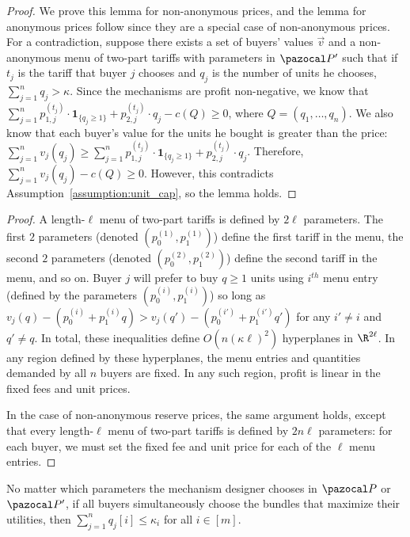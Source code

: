 \begin{proof}
We prove this lemma for non-anonymous prices, and the lemma for anonymous prices follow since they are a special case of non-anonymous prices. For a contradiction, suppose there exists a set of buyers' values $\vec{v}$ and a non-anonymous menu of two-part tariffs with parameters in $\pspace'$ such that if $t_j$ is the tariff that buyer $j$ chooses and $q_j$ is the number of units he chooses, $\sum_{j = 1}^n q_j > \kappa$. Since the mechanisms are profit non-negative, we know that $\sum_{j = 1}^n p_{1,j}^{(t_j)} \cdot \textbf{1}_{\{q_j \geq 1\}} + p_{2,j}^{(t_j)} \cdot q_j - c\left(Q\right) \geq 0$, where $Q = (q_1, \dots, q_n)$. We also know that each buyer's value for the units he bought is greater than the price: $\sum_{j = 1}^n v_j(q_j) \geq \sum_{j = 1}^n p_{1,j}^{(t_j)} \cdot \textbf{1}_{\{q_j \geq 1\}} + p_{2,j}^{(t_j)} \cdot q_j$. Therefore, $\sum_{j = 1}^n v_j(q_j) - c(Q) \geq 0$. However, this contradicts Assumption~\ref{assumption:unit_cap}, so the lemma holds.
\end{proof}

\twoPart*

\begin{proof}
A length-$\ell$ menu of two-part tariffs is defined by $2\ell$ parameters. The first $2$ parameters (denoted $\left(p_0^{(1)}, p_1^{(1)}\right)$) define the first tariff in the menu, the second $2$ parameters (denoted $\left(p_0^{(2)}, p_1^{(2)}\right)$) define the second tariff in the menu, and so on. Buyer $j$ will prefer to buy $q \geq 1$ units using $i^{th}$ menu entry (defined by the parameters $\left(p_0^{(i)}, p_1^{(i)}\right)$)  so long as
$v_j(q)  - \left(p_0^{(i)} + p_1^{(i)}q\right)> v_j(q')  - \left(p_0^{(i')} + p_1^{(i')}q'\right)$ for any $i' \not=i$ and $q' \not=q$. In total, these inequalities define $O\left(n\left(\kappa \ell\right)^2\right)$ hyperplanes in $\R^{2\ell}$. In any region defined by these hyperplanes, the menu entries and quantities demanded by all $n$ buyers are fixed. In any such region, profit is linear in the fixed fees and unit prices.

In the case of non-anonymous reserve prices, the same argument holds, except that every length-$\ell$ menu of two-part tariffs is defined by $2n\ell$ parameters: for each buyer, we must set the fixed fee and unit price for each of the $\ell$ menu entries.
\end{proof}

\begin{lemma}\label{lem:kappa_bnded_NL}
No matter which parameters the mechanism designer chooses in $\pspace$ or $\pspace'$, if all buyers simultaneously choose the bundles that maximize their utilities, then $\sum_{j = 1}^n q_j[i] \leq \kappa_i$ for all $i \in [m]$.
\end{lemma}


